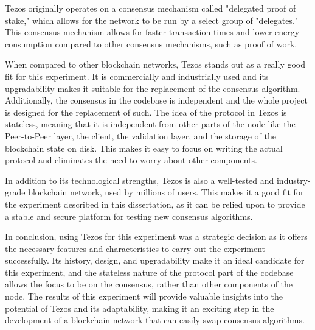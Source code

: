 Tezos originally operates on a consensus mechanism called "delegated proof of stake," which allows for the network to be run by a select group of "delegates." This consensus mechanism allows for faster transaction times and lower energy consumption compared to other consensus mechanisms, such as proof of work.

When compared to other blockchain networks, Tezos stands out as a really good fit for this experiment. It is commercially and industrially used and its upgradability makes it suitable for the replacement of the consensus algorithm. Additionally, the consensus in the codebase is independent and the whole project is designed for the replacement of such. 
The idea of the protocol in Tezos is stateless, meaning that it is independent from other parts of the node like the Peer-to-Peer layer, the client, the validation layer, and the storage of the blockchain state on disk.
This makes it easy to focus on writing the actual protocol and eliminates the need to worry about other components.

In addition to its technological strengths, Tezos is also a well-tested and industry-grade blockchain network, used by millions of users. This makes it a good fit for the experiment described in this dissertation, as it can be relied upon to provide a stable and secure platform for testing new consensus algorithms.


In conclusion, using Tezos for this experiment was a strategic decision as it offers the necessary features and characteristics to carry out the experiment successfully. Its history, design, and upgradability make it an ideal candidate for this experiment, and the stateless nature of the protocol part of the codebase allows the focus to be on the consensus, rather than other components of the node.
The results of this experiment will provide valuable insights into the potential of Tezos and its adaptability, making it an exciting step in the development of a blockchain network that can easily swap consensus algorithms.

